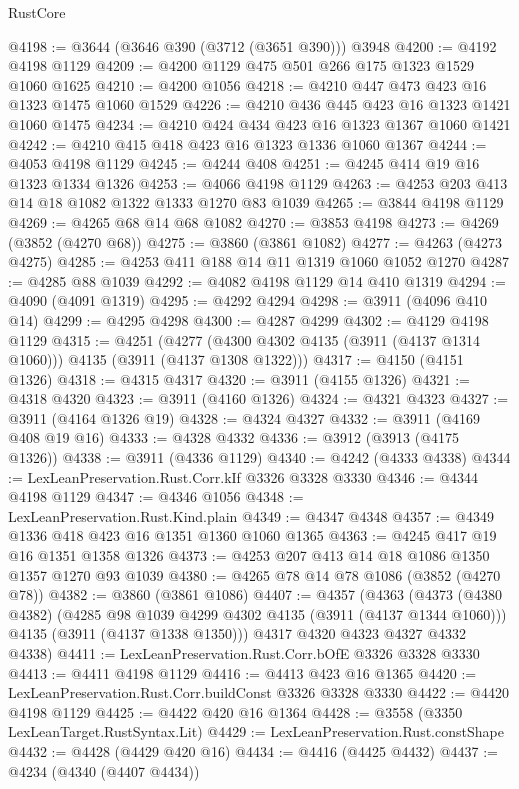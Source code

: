 \begin{lexlean}{RustCore}
\begin{coremodule}
@4198 := @3644 (@3646 @390 (@3712 (@3651 @390))) @3948
@4200 := @4192 @4198 @1129
@4209 := @4200 @1129 @475 @501 @266 @175 @1323 @1529 @1060 @1625
@4210 := @4200 @1056
@4218 := @4210 @447 @473 @423 @16 @1323 @1475 @1060 @1529
@4226 := @4210 @436 @445 @423 @16 @1323 @1421 @1060 @1475
@4234 := @4210 @424 @434 @423 @16 @1323 @1367 @1060 @1421
@4242 := @4210 @415 @418 @423 @16 @1323 @1336 @1060 @1367
@4244 := @4053 @4198 @1129
@4245 := @4244 @408
@4251 := @4245 @414 @19 @16 @1323 @1334 @1326
@4253 := @4066 @4198 @1129
@4263 := @4253 @203 @413 @14 @18 @1082 @1322 @1333 @1270 @83 @1039
@4265 := @3844 @4198 @1129
@4269 := @4265 @68 @14 @68 @1082
@4270 := @3853 @4198
@4273 := @4269 (@3852 (@4270 @68))
@4275 := @3860 (@3861 @1082)
@4277 := @4263 (@4273 @4275)
@4285 := @4253 @411 @188 @14 @11 @1319 @1060 @1052 @1270
@4287 := @4285 @88 @1039
@4292 := @4082 @4198 @1129 @14 @410 @1319
@4294 := @4090 (@4091 @1319)
@4295 := @4292 @4294
@4298 := @3911 (@4096 @410 @14)
@4299 := @4295 @4298
@4300 := @4287 @4299
@4302 := @4129 @4198 @1129
@4315 := @4251
    (@4277 (@4300 @4302 @4135 (@3911 (@4137 @1314 @1060))) @4135 (@3911 (@4137 @1308 @1322)))
@4317 := @4150 (@4151 @1326)
@4318 := @4315 @4317
@4320 := @3911 (@4155 @1326)
@4321 := @4318 @4320
@4323 := @3911 (@4160 @1326)
@4324 := @4321 @4323
@4327 := @3911 (@4164 @1326 @19)
@4328 := @4324 @4327
@4332 := @3911 (@4169 @408 @19 @16)
@4333 := @4328 @4332
@4336 := @3912 (@3913 (@4175 @1326))
@4338 := @3911 (@4336 @1129)
@4340 := @4242 (@4333 @4338)
@4344 := LexLeanPreservation.Rust.Corr.kIf @3326 @3328 @3330
@4346 := @4344 @4198 @1129
@4347 := @4346 @1056
@4348 := LexLeanPreservation.Rust.Kind.plain
@4349 := @4347 @4348
@4357 := @4349 @1336 @418 @423 @16 @1351 @1360 @1060 @1365
@4363 := @4245 @417 @19 @16 @1351 @1358 @1326
@4373 := @4253 @207 @413 @14 @18 @1086 @1350 @1357 @1270 @93 @1039
@4380 := @4265 @78 @14 @78 @1086 (@3852 (@4270 @78))
@4382 := @3860 (@3861 @1086)
@4407 := @4357
    (@4363
      (@4373
        (@4380 @4382)
        (@4285 @98 @1039 @4299 @4302 @4135 (@3911 (@4137 @1344 @1060)))
        @4135
        (@3911 (@4137 @1338 @1350)))
      @4317
      @4320
      @4323
      @4327
      @4332
      @4338)
@4411 := LexLeanPreservation.Rust.Corr.bOfE @3326 @3328 @3330
@4413 := @4411 @4198 @1129
@4416 := @4413 @423 @16 @1365
@4420 := LexLeanPreservation.Rust.Corr.buildConst @3326 @3328 @3330
@4422 := @4420 @4198 @1129
@4425 := @4422 @420 @16 @1364
@4428 := @3558 (@3350 LexLeanTarget.RustSyntax.Lit)
@4429 := LexLeanPreservation.Rust.constShape
@4432 := @4428 (@4429 @420 @16)
@4434 := @4416 (@4425 @4432)
@4437 := @4234 (@4340 (@4407 @4434))

\end{coremodule}
\end{lexlean}
